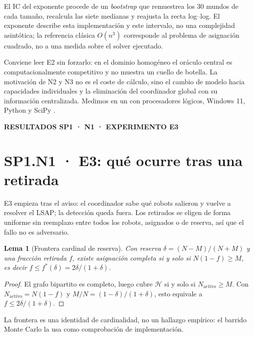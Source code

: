\documentclass[12pt,a4paper]{article}
\newcommand{\leveltag}[1]{%
  \noindent\colorbox{VIUDark}{%
    \parbox{\dimexpr\textwidth-2\fboxsep\relax}{%
      \color{white}\sffamily\bfseries\small #1%
    }%
  }\par\smallskip
}
\newtheorem{n1lema}{Lema}
\begin{document}
El IC del exponente procede de un \emph{bootstrap} que remuestrea los 30 mundos
de cada tamaño, recalcula las siete medianas y reajusta la recta log--log. El
exponente describe esta implementación y este intervalo, no una complejidad
asintótica; la referencia clásica $O(n^3)$ corresponde al problema de asignación
cuadrado, no a una medida sobre el solver ejecutado.

Conviene leer E2 sin forzarlo: en el dominio homogéneo el oráculo central es
computacionalmente competitivo y no muestra un cuello de botella. La motivación
de N2 y N3 no es el coste de cálculo, sino el cambio de modelo hacia capacidades
individuales y la eliminación del coordinador global con su información
centralizada. Medimos en un \NOneProcessor{} con \NOneLogicalCPU{} procesadores
lógicos, Windows 11, Python \NOnePythonVersion{} y SciPy \NOneSciPyVersion{}.

\clearpage

\leveltag{RESULTADOS SP1 · N1 · EXPERIMENTO E3}
\section*{SP1.N1 · E3: qué ocurre tras una retirada}

E3 empieza tras el aviso: el coordinador sabe qué robots salieron y vuelve a
resolver el LSAP; la detección queda fuera. Los retirados se eligen de forma
uniforme sin reemplazo entre todos los robots, asignados o de reserva, así que
el fallo no es adversario.

\begin{n1lema}[Frontera cardinal de reserva]
\label{lema:n1-reserve}
Con reserva $\delta=(N-M)/(N+M)$ y una fracción retirada $f$, existe asignación
completa si y solo si $N(1-f)\geq M$, es decir
$f\leq f^*(\delta)=2\delta/(1+\delta)$.
\end{n1lema}

{\small
\begin{proof}
El grafo bipartito es completo, luego cubre $\mathcal H$ si y solo si
$N_{\mathrm{activo}}\geq M$. Con $N_{\mathrm{activo}}=N(1-f)$ y
$M/N=(1-\delta)/(1+\delta)$, esto equivale a $f\leq2\delta/(1+\delta)$.
\end{proof}
}

La frontera es una identidad de cardinalidad, no un hallazgo empírico: el
barrido Monte Carlo la usa como comprobación de implementación.
\end{document}
